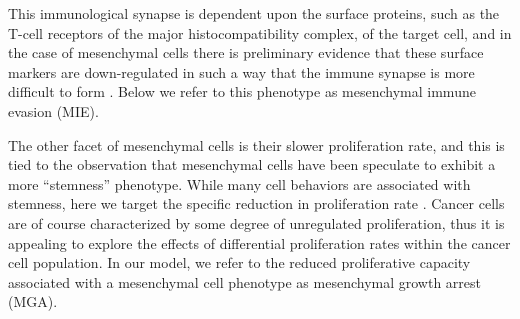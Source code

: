 \documentclass[11pt]{article}
\begin{document}
This immunological synapse is dependent upon the surface proteins, such as the T-cell receptors of the major histocompatibility complex, of the target cell, and in the case of mesenchymal cells there is preliminary evidence that these surface markers are down-regulated in such a way that the immune synapse is more difficult to form \cite{terry2017new}.
Below we refer to this phenotype as mesenchymal immune evasion (MIE).
\par
The other facet of mesenchymal cells is their slower proliferation rate, and this is tied to the observation that mesenchymal cells have been speculate to exhibit a more ``stemness'' phenotype.
While many cell behaviors are associated with stemness, here we target the specific reduction in proliferation rate \cite{woods2014effects}.
Cancer cells are of course characterized by some degree of unregulated proliferation, thus it is appealing to explore the effects of differential proliferation rates within the cancer cell population.
In our model, we refer to the reduced proliferative capacity associated with a mesenchymal cell phenotype as mesenchymal growth arrest (MGA).
  
\end{document}
